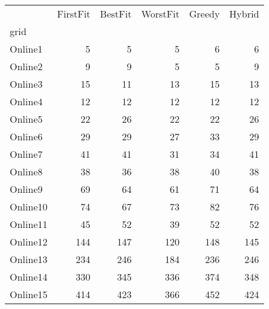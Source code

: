 \begin{tabular}{lrrrrr}
\toprule
{} &  FirstFit &  BestFit &  WorstFit &  Greedy &  Hybrid \\
grid     &           &          &           &         &         \\
\midrule
Online1  &         5 &        5 &         5 &       6 &       6 \\
Online2  &         9 &        9 &         5 &       5 &       9 \\
Online3  &        15 &       11 &        13 &      15 &      13 \\
Online4  &        12 &       12 &        12 &      12 &      12 \\
Online5  &        22 &       26 &        22 &      22 &      26 \\
Online6  &        29 &       29 &        27 &      33 &      29 \\
Online7  &        41 &       41 &        31 &      34 &      41 \\
Online8  &        38 &       36 &        38 &      40 &      38 \\
Online9  &        69 &       64 &        61 &      71 &      64 \\
Online10 &        74 &       67 &        73 &      82 &      76 \\
Online11 &        45 &       52 &        39 &      52 &      52 \\
Online12 &       144 &      147 &       120 &     148 &     145 \\
Online13 &       234 &      246 &       184 &     236 &     246 \\
Online14 &       330 &      345 &       336 &     374 &     348 \\
Online15 &       414 &      423 &       366 &     452 &     424 \\
\bottomrule
\end{tabular}
